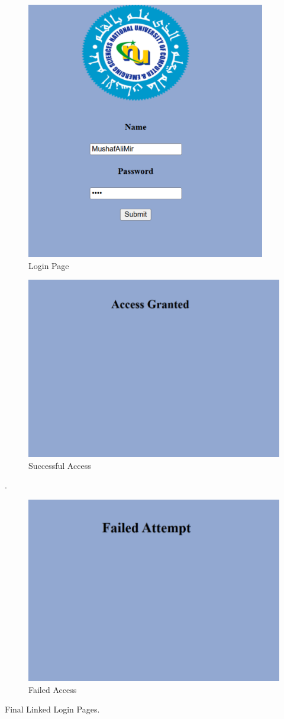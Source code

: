 \documentclass[a4paper,9pt]{article}
\begin{document}
\begin{enumerate}
	\begin{figure}[H]
		\centering
		\includegraphics[width=0.6\linewidth]{11.3.png}
		\caption{Login Page}
	\end{figure}
	\begin{figure}[H]
		\centering
		\includegraphics[width=0.8\linewidth]{11.4.png}
		\caption{Successful Access}
	\end{figure}
.
	\begin{figure}[H]
		\centering
		\includegraphics[width=0.8\linewidth]{11.5.png}
		\caption{Failed Access}
	\end{figure}
  Final Linked Login Pages.
\end{enumerate}
\end{document}

